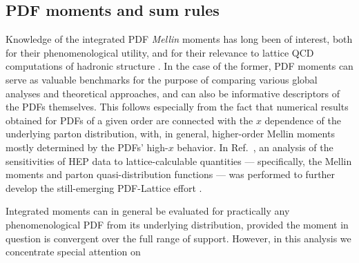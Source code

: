 \clearpage


\subsection{PDF moments and sum rules}
\label{sec:moments}

Knowledge of the integrated PDF {\it Mellin} moments has long been of interest, both for their phenomenological
utility, and for their relevance to lattice QCD computations of hadronic structure \cite{Lin:2017snn,Hobbs:2019gob,Lin:2020rut}.
In the case of the former, PDF moments can serve as valuable benchmarks for the purpose of comparing various global
analyses and theoretical approaches, and can also be informative descriptors of the PDFs themselves. This follows
especially from the fact that numerical results obtained for PDFs of a given order are connected with the $x$
dependence of the underlying parton distribution, with, in general, higher-order Mellin moments mostly determined
by the PDFs' high-$x$ behavior.  In Ref.~\cite{Hobbs:2019gob}, an analysis of the sensitivities of HEP data to
lattice-calculable quantities --- specifically, the Mellin moments and parton quasi-distribution functions --- was
performed to further develop the still-emerging PDF-Lattice effort \cite{Lin:2017snn,Lin:2020rut}. 

Integrated moments can in general be evaluated for practically any phenomenological PDF from its underlying distribution,
provided the moment in question is convergent over the full range of support. However, in this analysis we concentrate
special attention on

